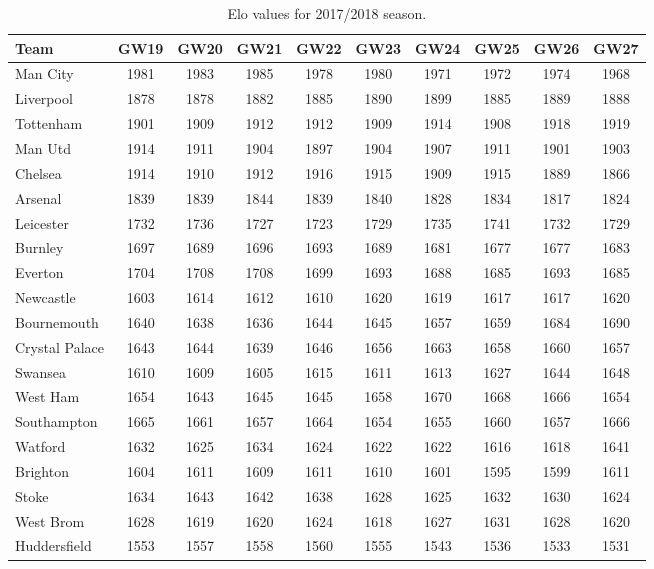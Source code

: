 \begin{table}[H]
\centering
\smaller
\begin{tabular}{|l|c|c|c|c|c|c|c|c|c|}
\hline
Team           & GW19 & GW20 & GW21 & GW22 & GW23 & GW24 & GW25 & GW26 & GW27 \\
\hline
Man City       & 1981 & 1983 & 1985 & 1978 & 1980 & 1971 & 1972 & 1974 & 1968 \\
Liverpool      & 1878 & 1878 & 1882 & 1885 & 1890 & 1899 & 1885 & 1889 & 1888 \\
Tottenham      & 1901 & 1909 & 1912 & 1912 & 1909 & 1914 & 1908 & 1918 & 1919 \\
Man Utd        & 1914 & 1911 & 1904 & 1897 & 1904 & 1907 & 1911 & 1901 & 1903 \\
Chelsea        & 1914 & 1910 & 1912 & 1916 & 1915 & 1909 & 1915 & 1889 & 1866 \\
Arsenal        & 1839 & 1839 & 1844 & 1839 & 1840 & 1828 & 1834 & 1817 & 1824 \\
Leicester      & 1732 & 1736 & 1727 & 1723 & 1729 & 1735 & 1741 & 1732 & 1729 \\
Burnley        & 1697 & 1689 & 1696 & 1693 & 1689 & 1681 & 1677 & 1677 & 1683 \\
Everton        & 1704 & 1708 & 1708 & 1699 & 1693 & 1688 & 1685 & 1693 & 1685 \\
Newcastle      & 1603 & 1614 & 1612 & 1610 & 1620 & 1619 & 1617 & 1617 & 1620 \\
Bournemouth    & 1640 & 1638 & 1636 & 1644 & 1645 & 1657 & 1659 & 1684 & 1690 \\
Crystal Palace & 1643 & 1644 & 1639 & 1646 & 1656 & 1663 & 1658 & 1660 & 1657 \\
Swansea        & 1610 & 1609 & 1605 & 1615 & 1611 & 1613 & 1627 & 1644 & 1648 \\
West Ham       & 1654 & 1643 & 1645 & 1645 & 1658 & 1670 & 1668 & 1666 & 1654 \\
Southampton    & 1665 & 1661 & 1657 & 1664 & 1654 & 1655 & 1660 & 1657 & 1666 \\
Watford        & 1632 & 1625 & 1634 & 1624 & 1622 & 1622 & 1616 & 1618 & 1641 \\
Brighton       & 1604 & 1611 & 1609 & 1611 & 1610 & 1601 & 1595 & 1599 & 1611 \\
Stoke          & 1634 & 1643 & 1642 & 1638 & 1628 & 1625 & 1632 & 1630 & 1624 \\
West Brom      & 1628 & 1619 & 1620 & 1624 & 1618 & 1627 & 1631 & 1628 & 1620 \\
Huddersfield   & 1553 & 1557 & 1558 & 1560 & 1555 & 1543 & 1536 & 1533 & 1531 \\
\hline
\end{tabular}
\caption{Elo values for 2017/2018 season.}
\label{tab:elo_values_gameweeks_3}
\end{table}


